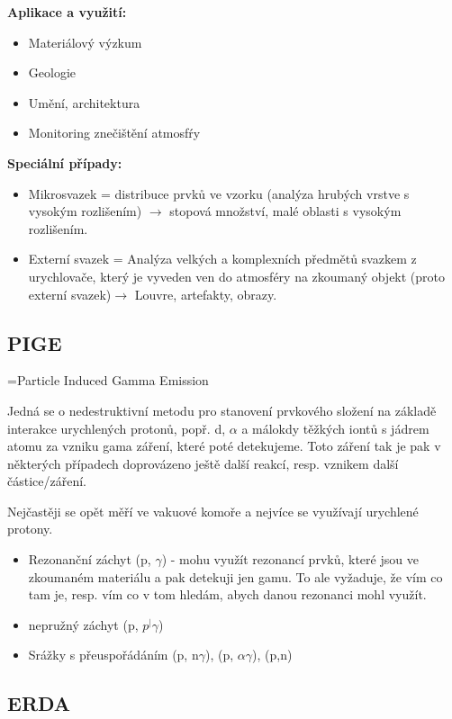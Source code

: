 \textbf{Aplikace a využití:}

\begin{itemize}
    \item Materiálový výzkum
    \item Geologie
    \item Umění, architektura
    \item Monitoring znečištění atmosfŕy
\end{itemize}

\textbf{Speciální případy:}

\begin{itemize}
    \item Mikrosvazek = distribuce prvků ve vzorku (analýza hrubých vrstve s vysokým rozlišením) $\rightarrow$ stopová množství, malé oblasti s vysokým rozlišením.
    \item Externí svazek = Analýza velkých a komplexních předmětů svazkem z urychlovače, který je vyveden ven do atmosféry na zkoumaný objekt (proto externí svazek)$\rightarrow$ Louvre, artefakty, obrazy.
\end{itemize}

\subsection{PIGE}

=Particle Induced Gamma Emission

Jedná se o nedestruktivní metodu pro stanovení prvkového složení na základě interakce urychlených protonů, popř. d, $\alpha$ a málokdy těžkých iontů s jádrem atomu za vzniku gama záření, které poté detekujeme. Toto záření tak je pak v některých případech doprovázeno ještě další reakcí, resp. vznikem další částice/záření.

Nejčastěji se opět měří ve vakuové komoře a nejvíce se využívají urychlené protony.

\begin{itemize}
    \item Rezonanční záchyt (p, $\gamma$) - mohu využít rezonancí prvků, které jsou ve zkoumaném materiálu a pak detekuji jen gamu. To ale vyžaduje, že vím co tam je, resp. vím co v tom hledám, abych danou rezonanci mohl využít.
    \item nepružný záchyt (p, $p^| \gamma$)
    \item Srážky s přeuspořádáním (p, n$\gamma$), (p, $\alpha\gamma$), (p,n)
\end{itemize}

\subsection{ERDA}

